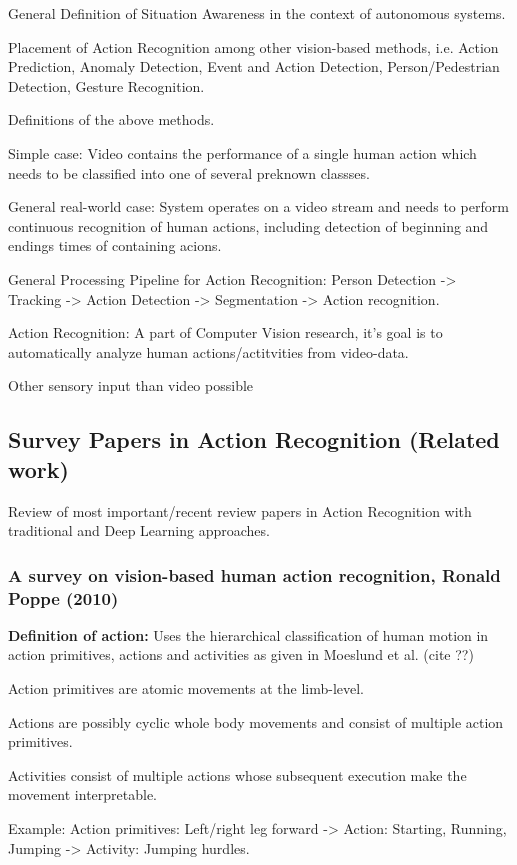 General Definition of Situation Awareness in the context of autonomous systems.

Placement of Action Recognition among other vision-based methods, i.e. Action Prediction, Anomaly Detection, Event and Action Detection, Person/Pedestrian Detection, Gesture Recognition.

Definitions of the above methods.

Simple case: Video contains the performance of a single human action which needs to be classified into one of several preknown classses.

General real-world case: System operates on a video stream and needs to perform continuous recognition of human actions, including detection of beginning and endings times of containing acions.

General Processing Pipeline for Action Recognition: Person Detection -> Tracking -> Action Detection -> Segmentation -> Action recognition.

Action Recognition: A part of Computer Vision research, it's goal is to automatically analyze human actions/actitvities from video-data. 

Other sensory input than video possible 


\subsection{Survey Papers in Action Recognition (Related work)}

Review of most important/recent review papers in Action Recognition with traditional and Deep Learning approaches.

\subsubsection{A survey on vision-based human action recognition, Ronald Poppe (2010)}

\textbf{Definition of action:} Uses the hierarchical classification of human motion in action primitives, actions and activities as given in Moeslund et al. (cite ??)

Action primitives are atomic movements at the limb-level.

Actions are possibly cyclic whole body movements and consist of multiple action primitives.

Activities consist of multiple actions whose subsequent execution make the movement interpretable.

Example: Action primitives: Left/right leg forward -> Action: Starting, Running, Jumping -> Activity: Jumping hurdles.

